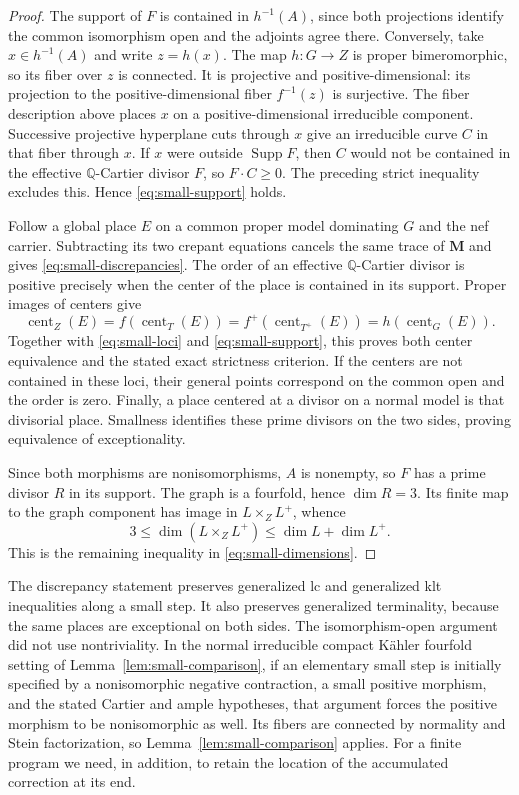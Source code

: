 \documentclass[11pt]{amsart}
\theoremstyle{definition}
\theoremstyle{remark}
\numberwithin{equation}{section}
\newcommand{\Q}{\mathbb{Q}}
\newcommand{\M}{\mathbf{M}}
\DeclareMathOperator{\Supp}{Supp}
\DeclareMathOperator{\cent}{cent}
\begin{document}
\begin{proof}
The support of $F$ is contained in $h^{-1}(A)$, since both projections
identify the common isomorphism open and the adjoints agree there.
Conversely, take $x\in h^{-1}(A)$ and write $z=h(x)$.  The map
$h:G\to Z$ is proper bimeromorphic, so its fiber over $z$ is connected.
It is projective and positive-dimensional: its projection to the
positive-dimensional fiber $f^{-1}(z)$ is surjective.  The fiber
description above places $x$ on a positive-dimensional irreducible
component.  Successive projective hyperplane cuts through $x$ give an
irreducible curve $C$ in that fiber through $x$.  If $x$ were outside
$\Supp F$, then $C$ would not be contained in the effective
$\Q$-Cartier divisor $F$, so $F\cdot C\geq0$.  The preceding strict
inequality excludes this.  Hence \eqref{eq:small-support} holds.

Follow a global place $E$ on a common proper model dominating $G$ and
the nef carrier.  Subtracting its two crepant equations cancels the
same trace of $\M$ and gives \eqref{eq:small-discrepancies}.  The order
of an effective $\Q$-Cartier divisor is positive precisely when the
center of the place is contained in its support.  Proper images of
centers give
\[
 \cent_Z(E)=f(\cent_T(E))=f^+(\cent_{T^+}(E))=h(\cent_G(E)).
\]
Together with \eqref{eq:small-loci} and \eqref{eq:small-support}, this
proves both center equivalence and the stated exact strictness
criterion.  If the centers are not contained in these loci, their
general points correspond on the common open and the order is zero.
Finally, a place centered at a divisor on a normal model is that
divisorial place.  Smallness identifies these prime divisors on the
two sides, proving equivalence of exceptionality.

Since both morphisms are nonisomorphisms, $A$ is nonempty, so $F$ has
a prime divisor $R$ in its support.  The graph is a fourfold, hence
$\dim R=3$.  Its finite map to the graph component has image in
$L\times_ZL^+$, whence
\[
 3\leq\dim(L\times_ZL^+)\leq\dim L+\dim L^+.
\]
This is the remaining inequality in \eqref{eq:small-dimensions}.
\end{proof}

The discrepancy statement preserves generalized lc and generalized
klt inequalities along a small step.  It also preserves generalized
terminality, because the same places are exceptional on both sides.
The isomorphism-open argument did not use nontriviality.  In the normal
irreducible compact K\"ahler fourfold setting of
Lemma~\ref{lem:small-comparison}, if an elementary small step is initially specified by a nonisomorphic
negative contraction, a small positive morphism, and the stated Cartier
and ample hypotheses, that argument forces the positive morphism to be
nonisomorphic as well.  Its fibers are connected by normality and Stein
factorization, so Lemma~\ref{lem:small-comparison} applies.
For a finite program we need, in addition, to retain the location of
the accumulated correction at its end.
\end{document}

